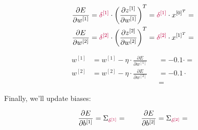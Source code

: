 \documentclass[12pt]{article}
\begin{document}
\begin{enumerate}[leftmargin=\labelsep]
\begin{enumerate}
                \begin{equation*}
                  \begin{aligned}
                    \frac{\partial E}{\partial w^{[1]}} & = \textcolor{purple}{\delta^{[1]}} \cdot
                    \left(\frac{\partial z^{[1]}}{\partial w^{[1]}}\right)^T
                    = \textcolor{purple}{\delta^{[1]}} \cdot x^{[0]^T}
                    =                                             \\
                    \frac{\partial E}{\partial w^{[2]}} & = \textcolor{purple}{\delta^{[2]}} \cdot
                    \left(\frac{\partial z^{[2]}}{\partial w^{[2]}}\right)^T
                    = \textcolor{purple}{\delta^{[2]}} \cdot x^{[1]^T}
                    = 
                  \end{aligned}
                \end{equation*}

                \begin{equation*}
                  \begin{aligned}
                    w^{[1]} & = w^{[1]} - \eta \cdot \frac{\partial E}{\partial w^{[1]}} &  &
                    =  - 0.1 \cdot 
                    =                                                                            \\
                    w^{[2]} & = w^{[2]} - \eta \cdot \frac{\partial E}{\partial w^{[2]}} &  &
                    =  - 0.1 \cdot                                           \\
                            &                                                            &  & = 
                  \end{aligned}
                \end{equation*}

                Finally, we'll update biases:

                $$
                  \frac{\partial E}{\partial b^{[1]}}
                  = \Sigma_{\textcolor{purple}{\delta^{[1]}}}
                  = 
                  \qquad
                  \frac{\partial E}{\partial b^{[2]}}
                  = \Sigma_{\textcolor{purple}{\delta^{[2]}}}
                  = 
                $$


\end{enumerate}
\end{enumerate}
\end{document}
